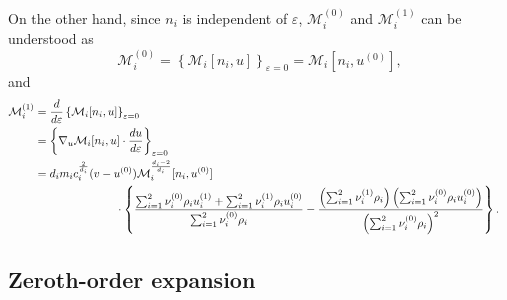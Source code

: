 \documentclass[10pt,reqno]{amsart}
\numberwithin{equation}{section}
\newcommand{\ve}{\varepsilon}
\begin{document}
On the other hand, since $n_i$ is independent of $\ve$, $\mathcal{M}_i^{(0)}$ and $\mathcal{M}_i^{(1)}$ can be understood as
\begin{equation*}
\mathcal{M}_i^{(0)}=\left\{\mathcal{M}_i[n_i,u]\right\}_{\ve=0}=\mathcal{M}_i[n_i,u^{(0)}],
\end{equation*}
and
\begin{align}\label{M1}\begin{split}
\mathcal{M}_i^{(1)}&=\frac{d}{d\ve}\left\{\mathcal{M}_i[n_i,u]\right\}_{\ve=0}\cr 
&=\left\{\nabla_u \mathcal{M}_i[n_i,u]\cdot \frac{d u}{d\ve}\right\}_{\ve=0}\cr 
&=d_im_ic_i^{\frac{2}{d_i}}(v-u^{(0)})\mathcal{M}_i^{\frac{d_i-2}{d_i}}[n_i,u^{(0)}]\cr
&\hspace{2.5cm} \cdot \left\{ \frac{ \sum_{i=1}^2\nu_i^{(0)} \rho_iu_i^{(1)}+\sum_{i=1}^2\nu_i^{(1)} \rho_iu_i^{(0)}}{\sum_{i=1}^2\nu_i^{(0)} \rho_i}-\frac{ \left(\sum_{i=1}^2\nu_i^{(1)} \rho_i \right)\left(\sum_{i=1}^2\nu_i^{(0)} \rho_iu_i^{(0)}\right)}{\left(\sum_{i=1}^2\nu_i^{(0)} \rho_i\right)^2} \right\}.
\end{split}\end{align} 
\subsection{Zeroth-order expansion}
\end{document}
